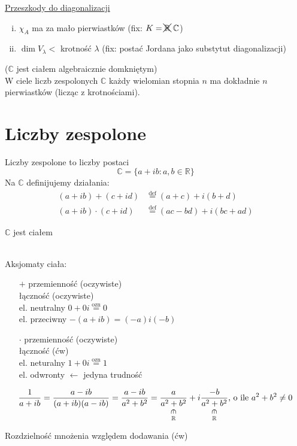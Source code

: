 \underline{Przeszkody do diagonalizacji}
\begin{enumerate}[(i)]
    \item $\chi _A$ ma za mało pierwiastków (fix:  $K = \xcancel{\mathbb{R}} \ \mathbb{C}$)
    \item $\dim V_\lambda < $ krotność $\lambda$ (fix: postać Jordana jako substytut diagonalizacji)
\end{enumerate}
\begin{tw} ($\mathbb{C}$ jest ciałem algebraicznie domkniętym) \\ 
    W ciele liczb zespolonych $\mathbb{C}$ każdy wielomian stopnia $n$ ma dokładnie $n$ pierwiastków
    (licząc z krotnościami). \end{tw} 
\section{Liczby zespolone} 
\begin{df} Liczby zespolone to liczby postaci 
    $$ \mathbb{C} = \{ a + ib : a,b \in \mathbb{R} \} $$ 
    Na $\mathbb{C}$ definijujemy działania: 
    \begin{align*}
        (a + ib) + (c+id) &\overset{\text{def}}{=} (a+c) + i(b+d) \\ 
        (a + ib) \cdot (c+id) &\overset{\text{def}}{=} (ac-bd) + i(bc+ad)
    \end{align*}
\end{df}
\begin{ft} $\mathbb{C}$ jest ciałem \end{ft} 
\begin{dd} ~\\ 
    Aksjomaty ciała:
    \begin{itemize} 
        \item[$+$] przemienność (oczywiste) \\ 
             łączność (oczywiste) \\ 
             el. neutralny $ 0 + 0i \overset{\text{ozn}}{=} 0$ \\ 
             el. przeciwny $-(a + ib) = (-a) i(-b)$
        \item[$\cdot$] przemienność (oczywiste) \\
             łączność (ćw) \\  
             el. neturalny $1 + 0i \overset{\text{ozn}}{=} 1$ \\ 
             el. odwronty $\leftarrow$ jedyna trudność
    \end{itemize} 
    \[ \frac{1}{a + ib} = \frac{a-ib}{(a+ib)(a-ib)} = \frac{a-ib}{a^2+b^2}=
    \underscript{\frac{a}{a^2+b^2}}{\vertin}{\mathbb{R}} + i \underscript{\frac{-b}{a^2+b^2}}{\vertin}{\mathbb{R}} 
    \text{, o ile } a^2 + b^2 \neq 0\]
    
    \item[] Rozdzielność mnożenia względem dodawania (ćw)
\end{dd} 
